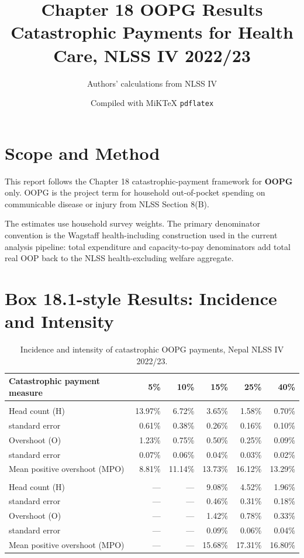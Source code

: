 \documentclass[11pt]{article}
\title{\textbf{Chapter 18 OOPG Results}\\
\large Catastrophic Payments for Health Care, NLSS IV 2022/23}
\author{Authors' calculations from NLSS IV}
\date{Compiled with MiKTeX \texttt{pdflatex}}
\begin{document}
\pagecolor{boxgreen}
\color{black}
\maketitle

\section*{Scope and Method}

This report follows the Chapter 18 catastrophic-payment framework for
\textbf{OOPG} only. OOPG is the project term for household out-of-pocket
spending on communicable disease or injury from NLSS Section 8(B).

The estimates use household survey weights. The primary denominator convention
is the Wagstaff health-including construction used in the current analysis
pipeline: total expenditure and capacity-to-pay denominators add total real OOP
back to the NLSS health-excluding welfare aggregate.

\section*{Box 18.1-style Results: Incidence and Intensity}

\begin{table}[!htbp]
\centering
\small
{}
\begin{tabular}{>{\raggedright\arraybackslash}p{}rrrrr}
\toprule
\textbf{Catastrophic payment measure} & \textbf{5\%} & \textbf{10\%} & \textbf{15\%} & \textbf{25\%} & \textbf{40\%} \\
\midrule
\multicolumn{6}{l}{\emph{OOPG as share of total expenditure}} \\
Head count (H) & 13.97\% & 6.72\% & 3.65\% & 1.58\% & 0.70\% \\
standard error & 0.61\% & 0.38\% & 0.26\% & 0.16\% & 0.10\% \\
Overshoot (O) & 1.23\% & 0.75\% & 0.50\% & 0.25\% & 0.09\% \\
standard error & 0.07\% & 0.06\% & 0.04\% & 0.03\% & 0.02\% \\
Mean positive overshoot (MPO) & 8.81\% & 11.14\% & 13.73\% & 16.12\% & 13.29\% \\
\addlinespace
\multicolumn{6}{l}{\emph{As share of capacity-to-pay expenditure}} \\
Head count (H) & --- & --- & 9.08\% & 4.52\% & 1.96\% \\
standard error & --- & --- & 0.46\% & 0.31\% & 0.18\% \\
Overshoot (O) & --- & --- & 1.42\% & 0.78\% & 0.33\% \\
standard error & --- & --- & 0.09\% & 0.06\% & 0.04\% \\
Mean positive overshoot (MPO) & --- & --- & 15.68\% & 17.31\% & 16.80\% \\
\bottomrule
\end{tabular}
\caption{Incidence and intensity of catastrophic OOPG payments, Nepal NLSS IV 2022/23.}
\end{table}
\end{document}
